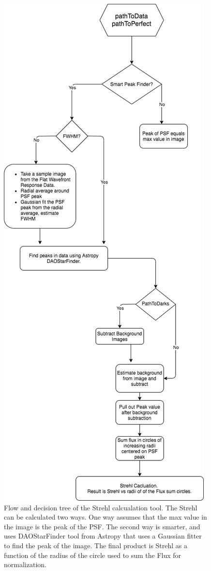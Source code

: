 \begin{figure}
    \centering
    \includegraphics[scale=0.4]{Chapter Materials/Appendix Materials/strehlclass2.png}
    \caption{Flow and decision tree of the Strehl calcualation tool. The Strehl can be calculated two ways. One way assumes that the max value in the image is the peak of the PSF. The second way is smarter, and uses DAOStarFinder tool from Astropy that uses a Gaussian fitter to find the peak of the image. The final product is Strehl as a function of the radius of the circle used to sum the Flux for normalization. }
    \label{fig:strehlClass}
\end{figure}

